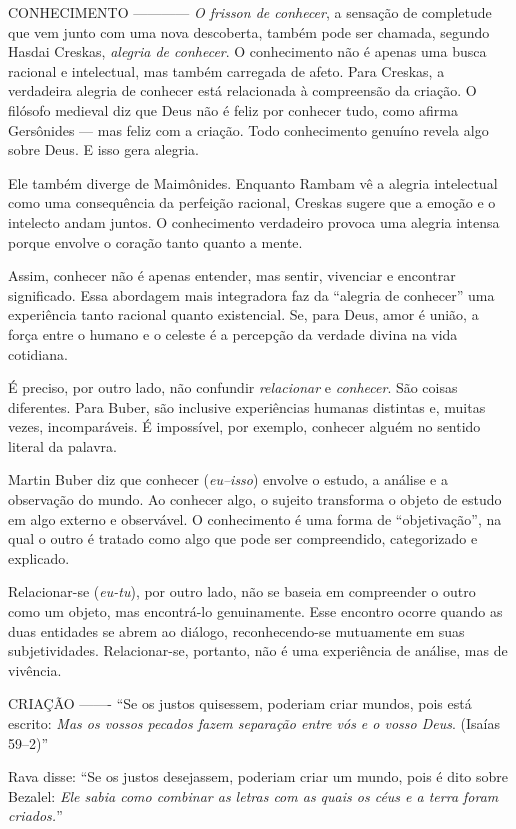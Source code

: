 CONHECIMENTO
------------
\textit{O \emph{frisson} de conhecer}, a sensação de completude que vem junto com uma nova descoberta, também pode ser chamada, segundo Hasdai Creskas, \textit{alegria de conhecer}. O conhecimento não é apenas uma busca racional e intelectual, mas também carregada de afeto. Para Creskas, a verdadeira alegria de conhecer está relacionada à compreensão da criação. O filósofo medieval diz que Deus não é feliz por conhecer tudo, como afirma Gersônides --- mas feliz com a criação. Todo conhecimento genuíno revela algo sobre Deus. E isso gera alegria. 

Ele também diverge de Maimônides. Enquanto Rambam vê a alegria intelectual como uma consequência da perfeição racional, Creskas sugere que a emoção e o intelecto andam juntos. O conhecimento verdadeiro provoca uma alegria intensa porque envolve o coração tanto quanto a mente.

Assim, conhecer não é apenas entender, mas sentir, vivenciar e encontrar significado. Essa abordagem mais integradora faz da “alegria de conhecer” uma experiência tanto racional quanto existencial. Se, para Deus, amor é união, a força entre o humano e o celeste é a percepção da verdade divina na vida cotidiana.

É preciso, por outro lado, não confundir \textit{relacionar} e \textit{conhecer}. São coisas diferentes. Para Buber, são inclusive experiências humanas distintas e, muitas vezes, incomparáveis. É impossível, por exemplo, conhecer alguém no sentido literal da palavra.

Martin Buber diz que conhecer (\textit{eu--isso}) envolve o estudo, a análise e a observação do mundo. Ao conhecer algo, o sujeito transforma o objeto de estudo em algo externo e observável. O conhecimento é uma forma de ``objetivação'', na qual o outro é tratado como algo que pode ser compreendido, categorizado e explicado.

Relacionar-se (\textit{eu-tu}), por outro lado, não se baseia em compreender o outro como um objeto, mas encontrá-lo genuinamente. Esse encontro ocorre quando as duas entidades se abrem ao diálogo, reconhecendo-se mutuamente em suas subjetividades. Relacionar-se, portanto, não é uma experiência de análise, mas de vivência.

CRIAÇÃO
-------
``Se os justos quisessem, poderiam criar mundos, pois está escrito: \textit{Mas os vossos pecados fazem separação entre vós e o vosso Deus}. (Isaías 59--2)''

Rava disse: ``Se os justos desejassem, poderiam criar um mundo, pois é dito sobre Bezalel: \textit{Ele sabia como combinar as letras com as quais os céus e a terra foram criados.}''

